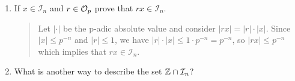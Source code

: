 \documentclass{hw}
\begin{document}
\begin{enumerate}
\begin{enumerate}
            \item If $x\in\mathcal{I}_{n}$ and $r\in\mathcal{O}_{p}$ prove that $rx\in\mathcal{I}_{n}$.
            \begin{quote}
                Let $|\cdot|$ be the p-adic absolute value and consider $|rx| = |r|\cdot|x|$. Since $|x|\leq p^{-n}$ and $|r|\leq1$, we have $|r|\cdot|x|\leq 1\cdot p^{-n} = p^{-n}$, so $|rx|\leq p^{-n}$ which implies that $rx\in\mathcal{I}_{n}$.
            \end{quote}

            \item What is another way to describe the set $\mathbb{Z}\cap\mathcal{I}_{n}$?
        \end{enumerate}
    \end{enumerate}
\end{document}

